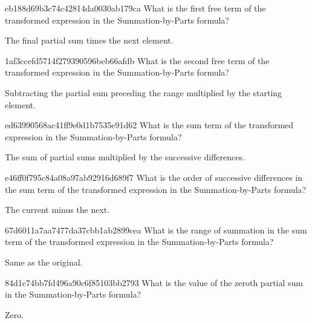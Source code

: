 \begin{note}{eb188d69b3c74c42814da0030ab179ca}
    What is the first free term of the transformed expression in the Summation-by-Parts formula?

    \begin{cloze}{1}
        The final partial sum times the next element.
    \end{cloze}
\end{note}

\begin{note}{1af3ccefd5714f279390596beb66afdb}
    What is the second free term of the transformed expression in the Summation-by-Parts formula?

    \begin{cloze}{1}
        Subtracting the partial sum preceding the range multiplied by the starting element.
    \end{cloze}
\end{note}

\begin{note}{ed63990568ac41ff9e0d1b7535e91d62}
    What is the sum term of the transformed expression in the Summation-by-Parts formula?

    \begin{cloze}{1}
        The sum of partial sums multiplied by the successive differences.
    \end{cloze}
\end{note}

\begin{note}{e46ff0f795c84a08a97ab92916d689f7}
    What is the order of successive differences in the sum term of the transformed expression in the Summation-by-Parts formula?

    \begin{cloze}{1}
        The current minus the next.
    \end{cloze}
\end{note}

\begin{note}{67d6011a7aa7477da37cbb1ab2899cea}
    What is the range of summation in the sum term of the transformed expression in the Summation-by-Parts formula?

    \begin{cloze}{1}
        Same as the original.
    \end{cloze}
\end{note}

\begin{note}{84d1c74bb7fd496a90c6f85103bb2793}
    What is the value of the zeroth partial sum in the Summation-by-Parts formula?

    \begin{cloze}{1}
        Zero.
    \end{cloze}
\end{note}

